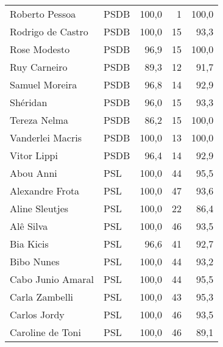 \begin{longtable}{llrrr}
                      Roberto Pessoa &           PSDB &     100,0 &            1 &      100,0 \\
                   Rodrigo de Castro &           PSDB &     100,0 &           15 &       93,3 \\
                        Rose Modesto &           PSDB &      96,9 &           15 &      100,0 \\
                        Ruy Carneiro &           PSDB &      89,3 &           12 &       91,7 \\
                      Samuel Moreira &           PSDB &      96,8 &           14 &       92,9 \\
                            Shéridan &           PSDB &      96,0 &           15 &       93,3 \\
                        Tereza Nelma &           PSDB &      86,2 &           15 &      100,0 \\
                    Vanderlei Macris &           PSDB &     100,0 &           13 &      100,0 \\
                         Vitor Lippi &           PSDB &      96,4 &           14 &       92,9 \\
                           Abou Anni &            PSL &     100,0 &           44 &       95,5 \\
                     Alexandre Frota &            PSL &     100,0 &           47 &       93,6 \\
                      Aline Sleutjes &            PSL &     100,0 &           22 &       86,4 \\
                           Alê Silva &            PSL &     100,0 &           46 &       93,5 \\
                           Bia Kicis &            PSL &      96,6 &           41 &       92,7 \\
                          Bibo Nunes &            PSL &     100,0 &           44 &       93,2 \\
                   Cabo Junio Amaral &            PSL &     100,0 &           44 &       95,5 \\
                      Carla Zambelli &            PSL &     100,0 &           43 &       95,3 \\
                        Carlos Jordy &            PSL &     100,0 &           46 &       93,5 \\
                    Caroline de Toni &            PSL &     100,0 &           46 &       89,1 \\

\end{longtable}
